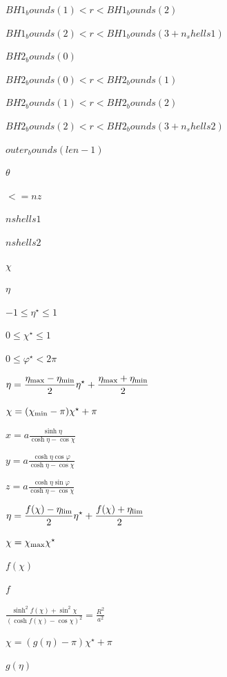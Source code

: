 \documentclass{article}
\begin{document}
$ BH1_bounds(1) < r < BH1_bounds(2) $
\pagebreak

$ BH1_bounds(2) < r < BH1_bounds(3+n_shells1) $
\pagebreak

$ BH2_bounds(0) $
\pagebreak

$ BH2_bounds(0) < r < BH2_bounds(1) $
\pagebreak

$ BH2_bounds(1) < r < BH2_bounds(2) $
\pagebreak

$ BH2_bounds(2) < r < BH2_bounds(3+n_shells2) $
\pagebreak

$ outer_bounds(len-1) $
\pagebreak

$\theta$
\pagebreak

$ <= nz $
\pagebreak

$ nshells1 $
\pagebreak

$ nshells2 $
\pagebreak

$ \chi $
\pagebreak

$ \eta $
\pagebreak

$ -1 \leq \eta^\star \leq 1 $
\pagebreak

$ 0 \leq \chi^\star \leq 1 $
\pagebreak

$ 0 \leq \varphi^\star < 2\pi $
\pagebreak

$ \eta = \displaystyle\frac{\eta_{\rm max}-\eta_{\rm min}}{2} \eta^\star + \displaystyle\frac{\eta_{\rm max}+\eta_{\rm min}}{2} $
\pagebreak

$ \chi = (\chi_{\rm min}- \pi) \chi^\star + \pi $
\pagebreak

$ x = a \displaystyle\frac{\sinh \eta}{\cosh\eta - \cos\chi} $
\pagebreak

$ y = a \displaystyle\frac{\cosh \eta \cos\varphi}{\cosh\eta - \cos\chi} $
\pagebreak

$ z = a \displaystyle\frac{\cosh \eta \sin\varphi}{\cosh\eta - \cos\chi} $
\pagebreak

$ \eta = \displaystyle\frac{f(\chi)-\eta_{\rm lim}}{2} \eta^\star + \displaystyle\frac{f(\chi)+\eta_{\rm lim}}{2} $
\pagebreak

$ \chi = \chi_{\rm max} \chi^\star $
\pagebreak

$ f (\chi) $
\pagebreak

$ f $
\pagebreak

$ \displaystyle\frac{\sinh ^2 f(\chi) + \sin ^2\chi} {(\cosh f(\chi) - \cos \chi)^2} = \displaystyle\frac{R^2}{a^2} $
\pagebreak

$ \chi = (g(\eta)-\pi) \chi^\star + \pi $
\pagebreak

$ g (\eta) $
\pagebreak
\end{document}
